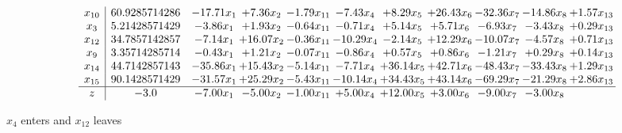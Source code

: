 \documentclass[9pt]{article}
\begin{document}
 \[\begin{array}{c| c c@{\hskip 2pt} c@{\hskip 2pt} c@{\hskip 2pt} c@{\hskip 2pt} c@{\hskip 2pt} c@{\hskip 2pt} c@{\hskip 2pt} c@{\hskip 2pt} c@{\hskip 2pt} }
 x_{10}   &  60.9285714286 & -17.71 x_{1} & +  7.36 x_{2} & -1.79 x_{11} & -7.43 x_{4} & +  8.29 x_{5} & + 26.43 x_{6} & -32.36 x_{7} & -14.86 x_{8} & +  1.57 x_{13}\\
 x_{3}   &  5.21428571429 & -3.86 x_{1} & +  1.93 x_{2} & -0.64 x_{11} & -0.71 x_{4} & +  5.14 x_{5} & +  5.71 x_{6} & -6.93 x_{7} & -3.43 x_{8} & +  0.29 x_{13}\\
 x_{12}   &  34.7857142857 & -7.14 x_{1} & + 16.07 x_{2} & -0.36 x_{11} & -10.29 x_{4} & -2.14 x_{5} & + 12.29 x_{6} & -10.07 x_{7} & -4.57 x_{8} & +  0.71 x_{13}\\
 x_{9}   &  3.35714285714 & -0.43 x_{1} & +  1.21 x_{2} & -0.07 x_{11} & -0.86 x_{4} & +  0.57 x_{5} & +  0.86 x_{6} & -1.21 x_{7} & +  0.29 x_{8} & +  0.14 x_{13}\\
 x_{14}   &  44.7142857143 & -35.86 x_{1} & + 15.43 x_{2} & -5.14 x_{11} & -7.71 x_{4} & + 36.14 x_{5} & + 42.71 x_{6} & -48.43 x_{7} & -33.43 x_{8} & +  1.29 x_{13}\\
 x_{15}   &  90.1428571429 & -31.57 x_{1} & + 25.29 x_{2} & -5.43 x_{11} & -10.14 x_{4} & + 34.43 x_{5} & + 43.14 x_{6} & -69.29 x_{7} & -21.29 x_{8} & +  2.86 x_{13}\\
\hline
z    &  -3.0 & -7.00 x_{1} & -5.00 x_{2} & -1.00 x_{11} & +  5.00 x_{4} & + 12.00 x_{5} & +  3.00 x_{6} & -9.00 x_{7} & -3.00 x_{8} &   \\
\end{array}\]


 $ x_{4} $ enters and $ x_{12} $ leaves 
\end{document}
